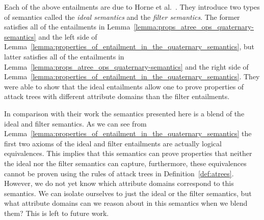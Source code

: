 Each of the above entailments are due to Horne et
al.~\cite{horne2017semantics}.  They introduce two types of semantics
called the \emph{ideal semantics} and the \emph{filter semantics}.
The former satisfies all of the entailments in
Lemma~\ref{lemma:props_atree_ops_quaternary-semantics} and the left
side of
Lemma~\ref{lemma:properties_of_entailment_in_the_quaternary_semantics},
but latter satisfies all of the entailments in
Lemma~\ref{lemma:props_atree_ops_quaternary-semantics} and the right
side of
Lemma~\ref{lemma:properties_of_entailment_in_the_quaternary_semantics}.
They were able to show that the ideal entailments allow one to prove
properties of attack trees with different attribute domains than the
filter entailments.

In comparison with their work the semantics presented here is a blend
of the ideal and filter semantics. As we can see from
Lemma~\ref{lemma:properties_of_entailment_in_the_quaternary_semantics}
the first two axioms of the ideal and filter entailments are actually
logical equivalences. This implies that this semantics can prove
properties that neither the ideal nor the filter semantics can
capture, furthermore, these equivalences cannot be proven using the
rules of attack trees in Definition~\ref{def:atrees}.  However, we do
not yet know which attribute domains correspond to this semantics.  We
can isolate ourselves to just the ideal or the filter semantics, but
what attribute domains can we reason about in this semantics when we
blend them?  This is left to future work.

